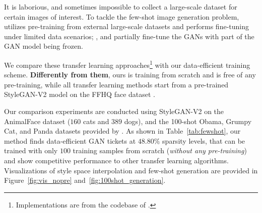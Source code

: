\documentclass{article}
\begin{document}
It is laborious, and sometimes impossible to collect a large-scale dataset for certain images of interest. To tackle the few-shot image generation problem, \cite{wang2018transferring} utilizes pre-training from external large-scale datasets and performs fine-tuning under limited data scenarios; \cite{mo2020freeze}, \cite{noguchi2019image} and \cite{wang2020minegan} partially fine-tune the GANs with part of the GAN model being frozen. 

We compare these transfer learning approaches\footnote{Implementations are from the codebase of \cite{mo2020freeze}.} with our data-efficient training scheme. \textbf{Differently from them}, ours is training from scratch and is free of any pre-training, while all transfer learning methods start from a pre-trained StyleGAN-V2 model on the FFHQ face dataset \cite{karras2019style}.

Our comparison experiments are conducted using StyleGAN-V2 on the AnimalFace \cite{si2011learning} dataset ($160$ cats and $389$ dogs), and the 100-shot Obama, Grumpy Cat, and Panda datasets provided by \cite{zhao2020diffaugment}. As shown in Table~\ref{tab:fewshot}, our method finds data-efficient GAN tickets at $48.80\%$ sparsity levels, that can be trained with only $100$ training samples from scratch (\textit{without any pre-training}) and show competitive performance to other transfer learning algorithms. Visualizations of style space interpolation and few-shot generation are provided in Figure~\ref{fig:vis_nopre} and~\ref{fig:100shot_generation}.
\end{document}
